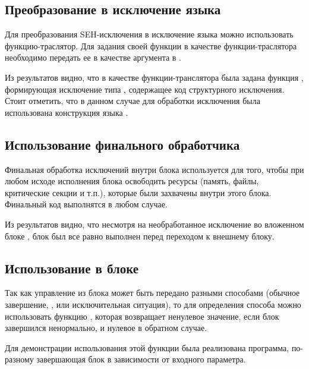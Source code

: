 \subsection{Преобразование в исключение языка }

Для преобразования SEH-исключения в исключение языка  можно использовать функцию-траслятор. Для задания своей функции в качестве функции-траслятора необходимо передать ее в качестве аргумента в .


Из результатов видно, что в качестве функции-транслятора была задана функция , формирующая исключение типа , содержащее код структурного исключения. Стоит отметить, что в данном случае для обработки исключения была использована конструкция  языка .

\subsection{Использование финального обработчика }

Финальная обработка исключений внутри блока  используется для того, чтобы при любом исходе исполнения блока  освободить ресурсы (память, файлы, критические секции и т.п.), которые были захвачены внутри этого блока. Финальный код выполнятся в любом случае.


Из результатов видно, что несмотря на необработанное исключение во вложенном блоке , блок  был все равно выполнен перед переходом к внешнему блоку.

\subsection{Использование  в блоке }

Так как управление из блока  может быть передано разными способами (обычное завершение, ,  или исключительная ситуация), то для определения способа можно использовать функцию , которая возвращает ненулевое значение, если блок завершился ненормально, и нулевое в обратном случае.

Для демонстрации использования этой функции была реализована программа, по-разному завершающая  блок в зависимости от входного параметра.

